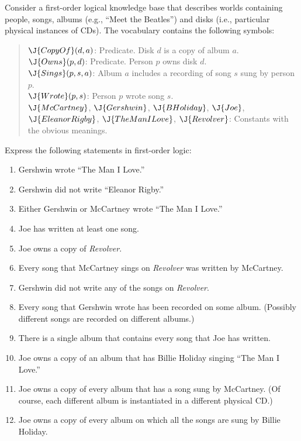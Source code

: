 \begin{exercise}%
Consider a first-order logical knowledge base that describes worlds containing people,
songs, albums (e.g., ``Meet the Beatles'') and disks (i.e., particular physical instances of CDs).
The vocabulary contains the following symbols:
\begin{quote}
\(\J{CopyOf}(d,a)\): Predicate. Disk \(d\) is a copy of album \(a\). \\
\(\J{Owns}(p,d)\): Predicate. Person \(p\) owns disk \(d\). \\
\(\J{Sings}(p,s,a)\): Album \(a\) includes a recording of song \(s\) sung by person \(p\).\\
\(\J{Wrote}(p,s)\): Person \(p\) wrote song \(s\). \\
\(\J{McCartney}\), \(\J{Gershwin}\), \(\J{BHoliday}\), \(\J{Joe}\), \(\J{EleanorRigby}\), \(\J{TheManILove}\), \(\J{Revolver}\):
Constants with the obvious meanings.
\end{quote}
Express the following statements in first-order logic:
\begin{enumerate}
\item Gershwin wrote ``The Man I Love.''
\item Gershwin did not write ``Eleanor Rigby.''
\item Either Gershwin or McCartney wrote ``The Man I Love.''
\item Joe has written at least one song.
\item Joe owns a copy of {\em Revolver}.
\item Every song that McCartney sings on {\em Revolver} was written by 
McCartney.
\item Gershwin did not write any of the songs on {\em Revolver}.
\item Every song that Gershwin wrote has been recorded on some album.
(Possibly different songs are recorded on different albums.)
\item There is a single album that contains every song that Joe has written.
\item Joe owns a copy of an album that has 
Billie Holiday singing ``The Man I Love.''
\item Joe owns a copy of every album that has a song sung by McCartney.
(Of course, each different album is instantiated in a different physical
CD.)
\item Joe owns a copy of every album on which all the songs are sung by
Billie Holiday.
\end{enumerate}
\end{exercise} 





